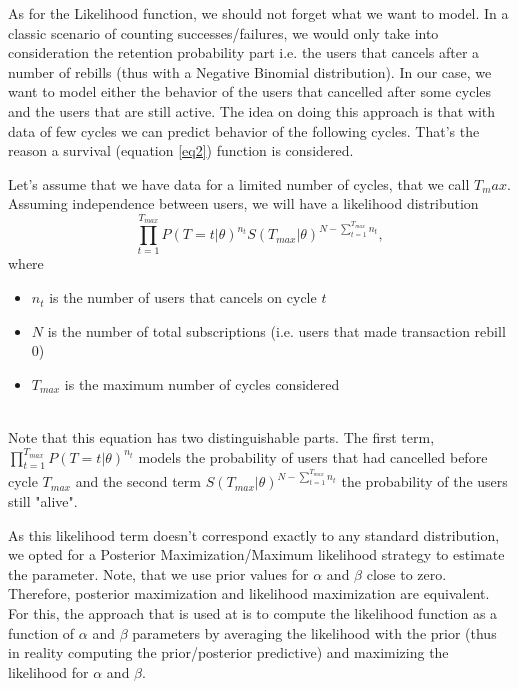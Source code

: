 \documentclass[paper=a4, fontsize=11pt]{scrartcl} %
\numberwithin{equation}{section} %
\numberwithin{figure}{section} %
\numberwithin{table}{section} %
\begin{document}
	As for the Likelihood function, we should not forget what we want to model. In a classic scenario of counting successes/failures, we would only take into consideration the retention probability part i.e. the users that cancels after a number of rebills (thus with a Negative Binomial distribution). In our case, we want to model either the behavior of the users that cancelled after some cycles and the users that are still active. The idea on doing this approach is that with data of few cycles we can predict behavior of the following cycles. That's the reason a survival (equation \ref{eq2}) function is considered.
	
	Let's assume that we have data for a limited number of cycles, that we call $T_max$. Assuming independence between users, we will have a likelihood distribution\\ 
	\begin{equation} \label{eq4}
	\prod_{t=1}^{T_{max}}P(T=t | \theta)^{n_t}S(T_{max} | \theta)^{N-\sum_{t=1}^{T_{max}}n_t},
	\end{equation}
	where
	\begin{itemize}
		\item  $n_t$ is the number of users that cancels on cycle $t$
		\item  $N$ is the number of total subscriptions (i.e. users that made transaction rebill 0)
		\item  $T_{max}$ is the maximum number of cycles considered
	\end{itemize}
	\hfill\\
	
	Note that this equation has two distinguishable parts.
	The first term, 
	$
	\prod_{t=1}^{T_{max}}P(T=t | \theta)^{n_t}
	$
	models the probability of users that had cancelled before cycle $T_{max}$ and the second term $S(T_{max} | \theta)^{N-\sum_{t=1}^{T_{max}}n_t}$  the probability of the users still "alive". 
	
	As this likelihood term doesn't correspond exactly to any standard distribution, we opted for a Posterior Maximization/Maximum likelihood strategy to estimate the parameter. Note, that we use prior values for $\alpha$ and $\beta$ close to zero. Therefore, posterior maximization and likelihood maximization are equivalent. For this, the approach that is used at \cite{feder07} is to compute the likelihood function as a function of $\alpha$ and $\beta$ parameters by averaging the likelihood with the prior (thus in reality computing the prior/posterior predictive) and maximizing the likelihood for $\alpha$ and $\beta$. 
	
\end{document}
